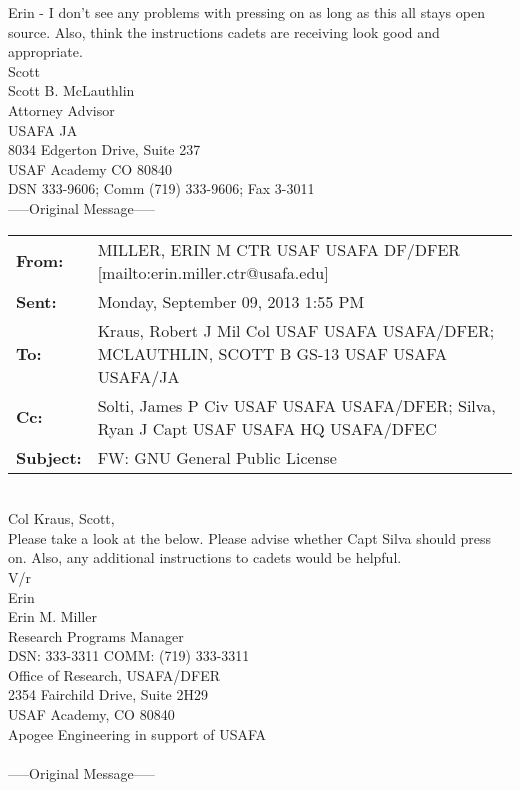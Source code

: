 \documentclass{article}
\begin{document}
Erin - I don't see any problems with pressing on as long as this all stays open source.  Also, think the instructions cadets are receiving look good and appropriate. \\

Scott \\

\noindent Scott B. McLauthlin \\
Attorney Advisor \\
USAFA JA \\
8034 Edgerton Drive, Suite 237 \\
USAF Academy CO 80840 \\
DSN 333-9606; Comm (719) 333-9606; Fax 3-3011 \\

\newpage
\noindent-----Original Message----- \\

\noindent \begin{tabu} to \textwidth{l X[l]}

 \textbf{From:} & MILLER, ERIN M CTR USAF USAFA DF/DFER [mailto:erin.miller.ctr@usafa.edu]  \\
 \textbf{Sent:} & Monday, September 09, 2013 1:55 PM \\
 \textbf{To:} & Kraus, Robert J Mil Col USAF USAFA USAFA/DFER; MCLAUTHLIN, SCOTT B GS-13 USAF USAFA USAFA/JA \\
 \textbf{Cc:} & Solti, James P Civ USAF USAFA USAFA/DFER; Silva, Ryan J Capt USAF USAFA HQ USAFA/DFEC \\
 \textbf{Subject:} & FW: GNU General Public License \\
\end{tabu}
\hspace{0pt} \\
Col Kraus, Scott, \\

Please take a look at the below. Please advise whether Capt Silva should press on. Also, any additional instructions to cadets would be helpful. \\

V/r \\

Erin \\

\noindent Erin M. Miller \\
Research Programs Manager \\
DSN: 333-3311 COMM: (719) 333-3311 \\
Office of Research, USAFA/DFER \\
2354 Fairchild Drive, Suite 2H29 \\
USAF Academy, CO 80840 \\
Apogee Engineering in support of USAFA \\
\hspace{0pt} \\
\noindent-----Original Message----- \\
\end{document}
